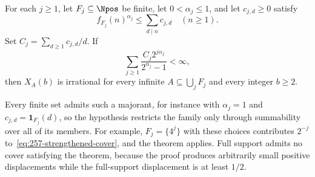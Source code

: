 \begin{thm}\label{thm:257-variable-fractional-cover}
For each $j\ge1$, let $F_j\subseteq\Npos$ be finite, let
$0<\alpha_j\le1$, and let $c_{j,d}\ge0$ satisfy
\[
 f_{F_j}(n)^{\alpha_j}\le\sum_{d\mid n}c_{j,d}\quad(n\ge1).
\]
Set $C_j=\sum_{d\ge1}c_{j,d}/d$.  If
\begin{equation}
 \sum_{j\ge1}\frac{C_j2^{j\alpha_j}}{2^{\alpha_j}-1}<\infty,
 \label{eq:257-strengthened-cover}
\end{equation}
then $X_A(b)$ is irrational for every infinite
$A\subseteq\bigcup_jF_j$ and every integer $b\ge2$.
\end{thm}

Every finite set admits such a majorant, for instance with $\alpha_j=1$
and $c_{j,d}=\mathbf1_{F_j}(d)$, so the hypothesis restricts the family
only through summability over all of its members. For example,
$F_j=\{4^j\}$ with these choices contributes $2^{-j}$
to~\eqref{eq:257-strengthened-cover}, and the theorem applies. Full support
admits no cover satisfying the theorem, because the proof produces
arbitrarily small positive displacements while the full-support
displacement is at least $1/2$.

